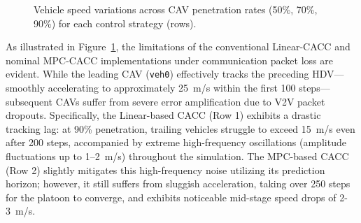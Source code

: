 \documentclass{ieeeaccess}
\begin{document}
\begin{figure}[htbp]
  \begin{minipage}[c]{\rowlabw}\centering
  \end{minipage}
  \begin{minipage}[c]{\panelw}\centering {} \end{minipage}\hspace{\sep}
  \begin{minipage}[c]{\panelw}\centering {} \end{minipage}\hspace{\sep}
  \begin{minipage}[c]{\panelw}\centering {} \end{minipage}

  \caption{Vehicle speed variations across CAV penetration rates (50\%, 70\%, 90\%) for each control strategy (rows).
  }
  \label{fig:speed_grid}
\end{figure}

As illustrated in Figure~\ref{fig:speed_grid}, the limitations of the conventional Linear-CACC and nominal MPC-CACC implementations under communication packet loss are evident. While the leading CAV (\texttt{veh0}) effectively tracks the preceding HDV—smoothly accelerating to approximately 25~m/s within the first 100 steps—subsequent CAVs suffer from severe error amplification due to V2V packet dropouts. Specifically, the Linear-based CACC (Row 1) exhibits a drastic tracking lag: at 90\% penetration, trailing vehicles struggle to exceed 15~m/s even after 200 steps, accompanied by extreme high-frequency oscillations (amplitude fluctuations up to 1--2~m/s) throughout the simulation. The MPC-based CACC (Row 2) slightly mitigates this high-frequency noise utilizing its prediction horizon; however, it still suffers from sluggish acceleration, taking over 250 steps for the platoon to converge, and exhibits noticeable mid-stage speed drops of 2-3~m/s.
\end{document}
